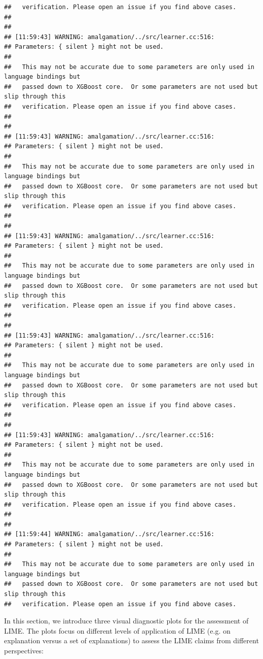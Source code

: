 \documentclass[AMS,STIX2COL]{WileyNJD-v2}\usepackage[]{graphicx}\usepackage[]{color}
\makeatletter
\newenvironment{kframe}{%
 \def\at@end@of@kframe{}%
 \ifinner\ifhmode%
  \def\at@end@of@kframe{\end{minipage}}%
  \begin{minipage}{\columnwidth}%
 \fi\fi%
 \def\FrameCommand##1{\hskip\@totalleftmargin \hskip-\fboxsep
 \colorbox{shadecolor}{##1}\hskip-\fboxsep
     \hskip-\linewidth \hskip-\@totalleftmargin \hskip\columnwidth}%
 \MakeFramed {\advance\hsize-\width
   \@totalleftmargin\z@ \linewidth\hsize
   \@setminipage}}%
 {\par\unskip\endMakeFramed%
 \at@end@of@kframe}
\newenvironment{knitrout}{}{} %
\makeatother
\begin{document}
\begin{knitrout}
\begin{kframe}
\begin{verbatim}
##   verification. Please open an issue if you find above cases.
## 
## 
## [11:59:43] WARNING: amalgamation/../src/learner.cc:516: 
## Parameters: { silent } might not be used.
## 
##   This may not be accurate due to some parameters are only used in language bindings but
##   passed down to XGBoost core.  Or some parameters are not used but slip through this
##   verification. Please open an issue if you find above cases.
## 
## 
## [11:59:43] WARNING: amalgamation/../src/learner.cc:516: 
## Parameters: { silent } might not be used.
## 
##   This may not be accurate due to some parameters are only used in language bindings but
##   passed down to XGBoost core.  Or some parameters are not used but slip through this
##   verification. Please open an issue if you find above cases.
## 
## 
## [11:59:43] WARNING: amalgamation/../src/learner.cc:516: 
## Parameters: { silent } might not be used.
## 
##   This may not be accurate due to some parameters are only used in language bindings but
##   passed down to XGBoost core.  Or some parameters are not used but slip through this
##   verification. Please open an issue if you find above cases.
## 
## 
## [11:59:43] WARNING: amalgamation/../src/learner.cc:516: 
## Parameters: { silent } might not be used.
## 
##   This may not be accurate due to some parameters are only used in language bindings but
##   passed down to XGBoost core.  Or some parameters are not used but slip through this
##   verification. Please open an issue if you find above cases.
## 
## 
## [11:59:43] WARNING: amalgamation/../src/learner.cc:516: 
## Parameters: { silent } might not be used.
## 
##   This may not be accurate due to some parameters are only used in language bindings but
##   passed down to XGBoost core.  Or some parameters are not used but slip through this
##   verification. Please open an issue if you find above cases.
## 
## 
## [11:59:44] WARNING: amalgamation/../src/learner.cc:516: 
## Parameters: { silent } might not be used.
## 
##   This may not be accurate due to some parameters are only used in language bindings but
##   passed down to XGBoost core.  Or some parameters are not used but slip through this
##   verification. Please open an issue if you find above cases.
\end{verbatim}
\end{kframe}
\end{knitrout}



In this section, we introduce three visual diagnostic plots for the assessment of LIME. The plots focus on different levels of application of LIME (e.g. on explanation versus a set of explanations) to assess the LIME claims from different perspectives:
\end{document}
